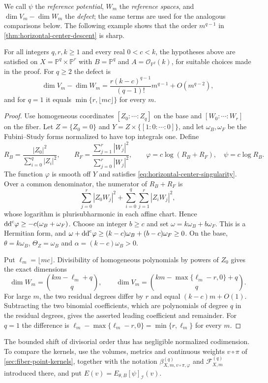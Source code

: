 We call $\psi$ the \emph{reference potential}, $W_m$ the \emph{reference spaces}, and $\dim V_m-\dim W_m$ the \emph{defect}; the same terms are used for the analogous comparisons below. The following example shows that the order $m^{q-1}$ in \cref{thm:horizontal-center-descent} is sharp.

\begin{example}\label{ex:horizontal-center-sharp-error}
For all integers $q,r,k\geq1$ and every real $0<c<k$, the hypotheses above are satisfied on $X=\mathbb P^q\times\mathbb P^r$ with $B=\mathbb P^q$ and $A=\mathcal O_{\mathbb P^q}(k)$, for suitable choices made in the proof. For $q\geq2$ the defect is
\[
 \dim V_m-\dim W_m
   =\frac{r(k-c)^{q-1}}{(q-1)!}m^{q-1}+O(m^{q-2}),
\]
and for $q=1$ it equals $\min\{r,\lfloor mc\rfloor\}$ for every $m$.
\end{example}
\begin{proof}
Use homogeneous coordinates $[Z_0:\cdots:Z_q]$ on the base and $[W_0:\cdots:W_r]$ on the fiber. Let $Z=\{Z_0=0\}$ and $Y=Z\times\{[1:0:\cdots:0]\}$, and let $\omega_B,\omega_F$ be the Fubini--Study forms normalized to have top integrals one. Define
\[
 R_B=\frac{|Z_0|^2}{\sum_{i=0}^q|Z_i|^2},\qquad
 R_F=\frac{\sum_{j=1}^r|W_j|^2}{\sum_{j=0}^r|W_j|^2},\qquad
 \varphi=c\log(R_B+R_F),\quad\psi=c\log R_B.
\]
The function $\varphi$ is smooth off $Y$ and satisfies \eqref{eq:horizontal-center-singularity}. Over a common denominator, the numerator of $R_B+R_F$ is
\[
 \sum_{j=0}^r|Z_0W_j|^2+\sum_{i=0}^q\sum_{j=1}^r|Z_iW_j|^2,
\]
whose logarithm is plurisubharmonic in each affine chart. Hence $\mathrm{dd}^{\mathrm{c}}\varphi\geq-c(\omega_B+\omega_F)$. Choose an integer $b\geq c$ and set $\omega=k\omega_B+b\omega_F$. This is a Hermitian form, and $\omega+\mathrm{dd}^{\mathrm{c}}\varphi\geq(k-c)\omega_B+(b-c)\omega_F\geq0$. On the base, $\theta=k\omega_B$, $\Theta_Z=\omega_B$ and $\alpha=(k-c)\omega_B>0$.

Put $\ell_m=\lfloor mc\rfloor$. Divisibility of homogeneous polynomials by powers of $Z_0$ gives the exact dimensions
\[
 \dim W_m=\binom{km-\ell_m+q}{q},\qquad
 \dim V_m=\binom{km-\max\{\ell_m-r,0\}+q}{q}.
\]
For large $m$, the two residual degrees differ by $r$ and equal $(k-c)m+O(1)$. Subtracting the two binomial coefficients, which are polynomials of degree $q$ in the residual degrees, gives the asserted leading coefficient and remainder. For $q=1$ the difference is $\ell_m-\max\{\ell_m-r,0\}=\min\{r,\ell_m\}$ for every $m$.
\end{proof}

The bounded shift of divisorial order thus has negligible normalized codimension. To compare the kernels, use the volumes, metrics and continuous weights $v\circ\pi$ of \cref{sec:fiber-point-kernels}, together with the notation $\beta_{X,m,v\circ\pi,\varphi}^{(q)}$ and $\mathcal F_{X,m}^{(q)}$ introduced there, and put $E(v)=E_{\theta,B}[\psi]_{\mathcal I}(v)$.

